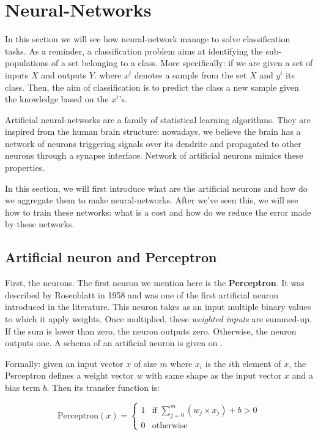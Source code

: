 
\section{Neural-Networks}
\label{sec:neural_networks}

	In this section we will see how neural-network manage to solve classification tasks. As a reminder, a classification problem aims at identifying the sub-populations of a set belonging to a class. More specifically: if we are given a set of inputs $X$ and outputs $Y$. where $x^i$ denotes a sample from the set $X$ and $y^i$ its class. Then, the aim of classification is to predict the class a new sample given the knowledge based on the $x^i$'s.

	Artificial neural-networks are a family of statistical learning algorithms. They are inspired from the human brain structure: nowadays, we believe the brain has a network of neurons triggering signals over its dendrite and propagated to other neurons through a synapse interface. Network of artificial neurons mimics these properties.

	In this section, we will first introduce what are the artificial neurons and how do we aggregate them to make neural-networks. After we've seen this, we will see how to train these networks: what is a cost and how do we reduce the error made by these networks.


	\subsection{Artificial neuron and Perceptron}
	\label{sec:Artificial_neurons}
		First, the neurons. The first neuron we mention here is the \textbf{Perceptron}. It was described by Rosenblatt in 1958 \cite{rosenblatt1958perceptron} and was one of the first artificial neuron introduced in the literature. This neuron takes as an input multiple binary values to which it apply weights. Once multiplied, these \textit{weighted inputs} are summed-up. If the sum is lower than zero, the neuron outputs zero. Otherwise, the neuron outputs one. A schema of an artificial neuron is given on .

		Formally: given an input vector $x$ of size $m$ where $x_i$ is the $i$th element of $x$, the Perceptron defines a weight vector $w$ with same shape as the input vector $x$ and a bias term $b$. Then its transfer function is:

		$$ \text{Perceptron}(x) = \begin{cases}1 & \text{if } \sum_{j=0}^m (w_j \times x_j) + b > 0\\0 & \text{otherwise}\end{cases} $$

